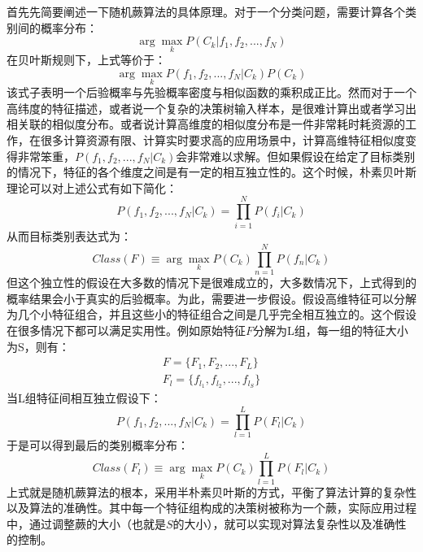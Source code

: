 首先先简要阐述一下随机蕨算法的具体原理。对于一个分类问题，需要计算各个类别间的概率分布：
\begin{equation}
	\arg\max_{k} P(C_k|f_1,f_2,...,f_N)
\end{equation}
在贝叶斯规则下，上式等价于：
\begin{equation}
	\arg\max_{k} P(f_1,f_2,...,f_N|C_k)P(C_k)
\end{equation}
该式子表明一个后验概率与先验概率密度与相似函数的乘积成正比。然而对于一个高纬度的特征描述，或者说一个复杂的决策树输入样本，是很难计算出或者学习出相关联的相似度分布。或者说计算高维度的相似度分布是一件非常耗时耗资源的工作，在很多计算资源有限、计算实时要求高的应用场景中，计算高维特征相似度变得非常笨重，$P(f_1,f_2,...,f_N|C_k)$会非常难以求解。但如果假设在给定了目标类别的情况下，特征的各个维度之间是有一定的相互独立性的。这个时候，朴素贝叶斯理论可以对上述公式有如下简化：
\begin{equation}
	P(f_1,f_2,...,f_N|C_k)=\prod_{i=1}^N P(f_i|C_k)
\end{equation}
从而目标类别表达式为：
\begin{equation}
	Class(F)\equiv \arg\max_k P(C_k)\prod_{n=1}^N P(f_n|C_k)
\end{equation}
但这个独立性的假设在大多数的情况下是很难成立的，大多数情况下，上式得到的概率结果会小于真实的后验概率。为此，需要进一步假设。假设高维特征可以分解为几个小特征组合，并且这些小的特征组合之间是几乎完全相互独立的。这个假设在很多情况下都可以满足实用性。例如原始特征$F$分解为L组，每一组的特征大小为S，则有：
\begin{equation}
\begin{aligned}
	F=\{F_1,F_2,...,F_L\} \\
	F_l=\{f_{l_1},f_{l_2},...,f_{l_S}\}
\end{aligned}
\end{equation}
当L组特征间相互独立假设下：
\begin{equation}
	P(f_1,f_2,...,f_N|C_k)=\prod_{l=1}^L P(F_l|C_k)
\end{equation}
于是可以得到最后的类别概率分布：
\begin{equation}
	Class(F_l)\equiv \arg\max_k P(C_k)\prod_{l=1}^L P(F_l|C_k)
\end{equation}
上式就是随机蕨算法的根本，采用半朴素贝叶斯的方式，平衡了算法计算的复杂性以及算法的准确性。其中每一个特征组构成的决策树被称为一个蕨，实际应用过程中，通过调整蕨的大小（也就是$S$的大小），就可以实现对算法复杂性以及准确性的控制。

